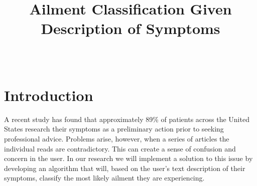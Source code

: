 \documentclass[12pt, final, onecolumn, comsoc, conference]{IEEEtran}
\begin{document}
\title{Ailment Classification Given Description of Symptoms}
\author{
	\\
}

\maketitle
\section{Introduction} A recent study has found that approximately
89\% of patients across the United States research their symptoms as a
preliminary action prior to seeking professional advice. Problems arise,
however, when a series of articles the individual reads are contradictory. This
can create a sense of confusion and concern in the user. In our research we will
implement a solution to this issue by developing an algorithm that will, based
on the user's text description of their symptoms, classify the most likely
ailment they are experiencing.
\end{document}
